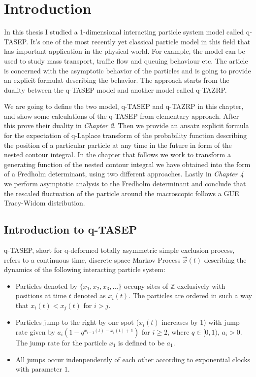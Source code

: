 \chapter{Introduction}
In this thesis I studied a 1-dimensional interacting particle system model called q-TASEP. It's one of the most recently yet classical particle model in this field that has important application in the physical world. For example, the model can be used to study mass transport, traffic flow and queuing behaviour etc. The article is concerned with the asymptotic behavior of the particles and is going to provide an explicit formulat describing the behavior. The approach starts from the duality between the q-TASEP model and another model called q-TAZRP. 

We are going to define the two model, q-TASEP and q-TAZRP in this chapter, and show some calculations of the q-TASEP from elementary approach. After this prove their duality in \textit{Chapter 2}. Then we provide an ansatz explicit formula for the expectation of q-Laplace transform of the probability function describing the position of a particular particle at any time in the future in form of the nested contour integral. In the chapter that follows we work to transform a generating function of the nested contour integral we have obtained into the form of a Fredholm determinant, using two different approaches. Lastly in \textit{Chapter 4} we perform asymptotic analysis to the Fredholm determinant and conclude that the rescaled fluctuation of the particle around the macroscopic follows a GUE Tracy-Widom distribution.

\section{Introduction to q-TASEP}
\label{sec:intro-qtasep}

q-TASEP, short for q-deformed totally asymmetric simple exclusion process, refers to a continuous time, discrete space Markov Process $\vec{x}(t)$ describing the dynamics of the following interacting particle system:

\begin{itemize}
\item Particles denoted by $\{x_1, x_2, x_3, ...\}$ occupy sites of $\mathbb{Z}$ exclusively with positions at time $t$ denoted as $x_i(t)$. The particles are ordered in such a way that $x_i(t) < x_j(t)$ for $i > j$.
\item Particles jump to the right by one spot ($x_i(t)$ increases by $1$) with jump rate given by $a_i (1-q^{x_{i-1}(t)-x_i(t)+1})$ for $i \ge 2$, where $q \in [0,1)$, $a_i > 0$. The jump rate for the particle $x_1$ is defined to be $a_1$.
\item All jumps occur indenpendently of each other according to exponential clocks with parameter $1$.
\end{itemize}

